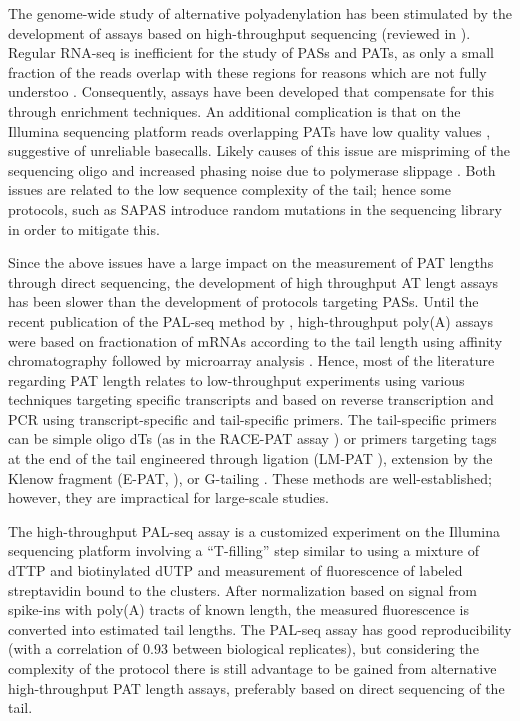 \documentclass[10pt]{article}
\begin{document}
The genome-wide study of alternative polyadenylation has been stimulated by the development of assays based on high-throughput sequencing (reviewed in \cite{elkon13}). Regular RNA-seq is inefficient for the study of PASs and PATs, as only a small fraction of the reads overlap with these regions for reasons which are not fully understoo \cite{fu11,wilkening13}. Consequently, assays have been developed that compensate for this through enrichment techniques. An additional complication is that on the Illumina sequencing platform reads overlapping PATs have low quality values \cite{wilkening13}, suggestive of unreliable basecalls. Likely causes of this issue are mispriming of the sequencing oligo and increased phasing noise due to polymerase slippage \cite{wilkening13}. Both issues are related to the low sequence complexity of the tail; hence some protocols, such as SAPAS \cite{fu11} introduce random mutations in the sequencing library in order to mitigate this.

Since the above issues have a large impact on the measurement of PAT lengths through direct sequencing, the development of high throughput AT lengt assays has been slower than the development of protocols targeting PASs. Until the recent publication of the PAL-seq method by \cite{subtelny14}, high-throughput poly(A) assays were based on fractionation of mRNAs according to the tail length using affinity chromatography followed by microarray analysis \cite{beilharz07,meijer07}. Hence, most of the literature regarding PAT length relates to low-throughput experiments using various techniques targeting specific transcripts \cite{salles95} and based on reverse transcription and PCR using transcript-specific and tail-specific primers. The tail-specific primers can be simple oligo dTs (as in the RACE-PAT assay \cite{salles95}) or primers targeting tags at the end of the tail engineered through ligation (LM-PAT \cite{salles95}), extension by the Klenow fragment (E-PAT, \cite{janicke12}), or G-tailing \cite{kusov01}. These methods are well-established; however, they are impractical for large-scale studies.

The high-throughput PAL-seq assay \cite{subtelny14} is a customized experiment on the Illumina sequencing platform involving a ``T-filling'' step similar to \cite{wilkening13} using a mixture of dTTP and biotinylated dUTP and measurement of fluorescence of labeled streptavidin bound to the clusters. After normalization based on signal from spike-ins with poly(A) tracts of known length, the measured fluorescence is converted into estimated tail lengths. The PAL-seq assay has good reproducibility (with a correlation of 0.93 between biological replicates), but considering the complexity of the protocol there is still advantage to be gained from alternative high-throughput PAT length assays, preferably based on direct sequencing of the tail.
\end{document}
